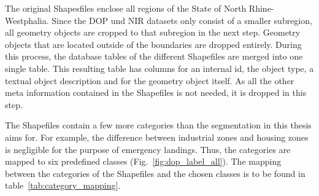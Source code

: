 The original Shapesfiles enclose all regions of the State of North Rhine-Westphalia. Since the DOP und NIR datasets only consist of a smaller subregion, all geometry objects are cropped to that subregion in the next step. Geometry objects that are located outside of the boundaries are dropped entirely. During this process, the database tables of the different Shapefiles are merged into one single table. This resulting table has columns for an internal id, the object type, a textual object description and for the geometry object itself. As all the other meta information contained in the Shapefiles is not needed, it is dropped in this step.

The Shapefiles contain a few more categories than the segmentation in this thesis aims for. For example, the difference between industrial zones and housing zones is negligible for the purpose of emergency landings. Thus, the categories are mapped to six predefined classes (Fig.~\ref{fig:dop_label_all}). The mapping between the categories of the Shapefiles and the chosen classes is to be found in table~\ref{tab:category_mapping}.

